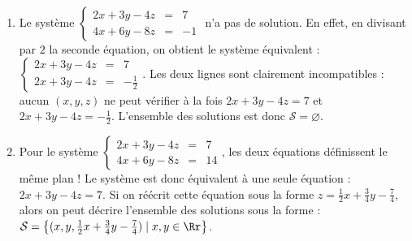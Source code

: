 \documentclass[class=report,crop=false]{standalone}
\begin{document}
\begin{exemple}
\sauteligne
\begin{enumerate}
  \item Le système $\left\{\begin{array}{rcl}
2 x + 3 y - 4 z  & = & 7 \\
4 x + 6 y - 8 z  & = & -1
\end{array}\right.$ n'a pas de solution. En effet, en divisant par $2$ la seconde équation,
on obtient le système équivalent :
$\left\{\begin{array}{rcl}
2 x + 3 y - 4 z  & = & 7 \\
2 x + 3 y - 4 z  & = & -\frac12
\end{array}\right.$. Les deux lignes sont clairement incompatibles : aucun $(x,y,z)$
ne peut vérifier à la fois $2 x + 3 y - 4 z  = 7$ et $2 x + 3 y - 4 z  =  -\frac12$.
L'ensemble des solutions est donc $\mathcal{S}=\varnothing$.

  \item Pour le système $\left\{\begin{array}{rcl}
2 x + 3 y - 4 z  & = & 7 \\
4 x + 6 y - 8 z  & = & 14
 \end{array}\right.$, les deux équations définissent le même plan !
 Le système est donc équivalent à une seule équation : $2 x + 3 y - 4 z = 7$.
 Si on réécrit cette équation sous la forme $z=\frac12 x + \frac34 y - \frac74$,
 alors on peut décrire l'ensemble des solutions sous la forme :
 $\mathcal{S}= \big\lbrace (x,y,\frac12 x + \frac34 y - \frac74) \mid x,y\in \Rr \big\rbrace$.


\end{enumerate}
\end{exemple}
\end{document}
